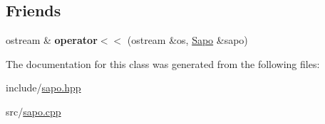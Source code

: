 \subsection*{Friends}
\begin{DoxyCompactItemize}
\item 
\mbox{\label{classSapo_a68602cd46f03c06dd19950f8e1e20346}} 
ostream \& {\bfseries operator$<$$<$} (ostream \&os, \hyperlink{classSapo}{Sapo} \&sapo)
\end{DoxyCompactItemize}


The documentation for this class was generated from the following files\+:\begin{DoxyCompactItemize}
\item 
include/\hyperlink{sapo_8hpp}{sapo.\+hpp}\item 
src/\hyperlink{sapo_8cpp}{sapo.\+cpp}\end{DoxyCompactItemize}
